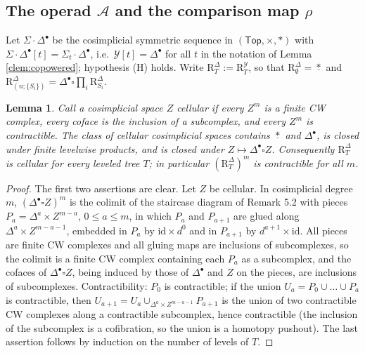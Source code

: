 \documentclass[12pt]{article}
\theoremstyle{plain}
\newtheorem{clemma}[ctheorem]{Lemma}
\theoremstyle{definition}
\theoremstyle{remark}
\newcommand{\Cal}[1]{\mathcal{#1}}
\newcommand{\SD}{\Sigma{\cdot}\Delta^{\bullet}}
\newcommand{\pt}{*}
\newcommand{\id}{\mathrm{id}}
\newcommand{\Rr}{\mathrm{R}}
\begin{document}
\subsection{The operad $\Cal A$ and the comparison map $\rho$}
\label{sec:corr:A}

Let $\SD$ be the cosimplicial symmetric sequence in $(\mathsf{Top},\times,\pt)$ with $\SD[t]=\Sigma_t\cdot\Delta^\bullet$, i.e.\ $\Cal Y[t]=\Delta^\bullet$ for all $t$ in the notation of Lemma \ref{clem:copowered}; hypothesis (H) holds. Write $\Rr^\Delta_T:=\Rr^{\Cal Y}_T$, so that $\Rr^\Delta_\emptyset=\underline\pt$ and $\Rr^\Delta_{(n;\{S_i\})}=\Delta^\bullet\square\prod_i\Rr^\Delta_{S_i}$.

\begin{clemma}\label{clem:contractible}
Call a cosimplicial space $Z$ \emph{cellular} if every $Z^m$ is a finite CW complex, every coface is the inclusion of a subcomplex, and every $Z^m$ is contractible. The class of cellular cosimplicial spaces contains $\underline\pt$ and $\Delta^\bullet$, is closed under finite levelwise products, and is closed under $Z\mapsto\Delta^\bullet\square Z$. Consequently $\Rr^\Delta_T$ is cellular for every leveled tree $T$; in particular $(\Rr^\Delta_T)^m$ is contractible for all $m$.
\end{clemma}

\begin{proof}
The first two assertions are clear. Let $Z$ be cellular. In cosimplicial degree $m$, $(\Delta^\bullet\square Z)^m$ is the colimit of the staircase diagram of Remark 5.2 with pieces $P_a=\Delta^a\times Z^{m-a}$, $0\leq a\leq m$, in which $P_a$ and $P_{a+1}$ are glued along $\Delta^a\times Z^{m-a-1}$, embedded in $P_a$ by $\id\times d^0$ and in $P_{a+1}$ by $d^{a+1}\times\id$. All pieces are finite CW complexes and all gluing maps are inclusions of subcomplexes, so the colimit is a finite CW complex containing each $P_a$ as a subcomplex, and the cofaces of $\Delta^\bullet\square Z$, being induced by those of $\Delta^\bullet$ and $Z$ on the pieces, are inclusions of subcomplexes. Contractibility: $P_0$ is contractible; if the union $U_a=P_0\cup\dots\cup P_a$ is contractible, then $U_{a+1}=U_a\cup_{\Delta^a\times Z^{m-a-1}}P_{a+1}$ is the union of two contractible CW complexes along a contractible subcomplex, hence contractible (the inclusion of the subcomplex is a cofibration, so the union is a homotopy pushout). The last assertion follows by induction on the number of levels of $T$.
\end{proof}
\end{document}
